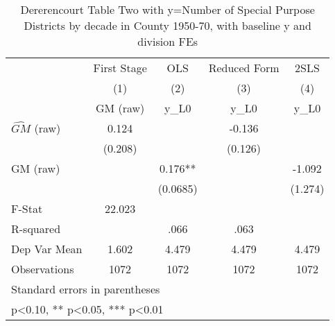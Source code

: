 \begin{table}[htbp]\centering
\def\sym#1{\ifmmode^{#1}\else\(^{#1}\)\fi}
\caption{Dererencourt Table Two with y=Number of Special Purpose Districts by decade in County 1950-70, with baseline y and division FEs}
\begin{tabular}{l*{4}{c}}
\toprule
                    & First Stage   &         OLS   &Reduced Form   &        2SLS   \\
                    &\multicolumn{1}{c}{(1)}&\multicolumn{1}{c}{(2)}&\multicolumn{1}{c}{(3)}&\multicolumn{1}{c}{(4)}\\
                    &\multicolumn{1}{c}{GM  (raw)}&\multicolumn{1}{c}{y\_L0}&\multicolumn{1}{c}{y\_L0}&\multicolumn{1}{c}{y\_L0}\\
\midrule
$\hat{GM}$ (raw)    &       0.124   &               &      -0.136   &               \\
                    &     (0.208)   &               &     (0.126)   &               \\
\addlinespace
GM  (raw)           &               &       0.176** &               &      -1.092   \\
                    &               &    (0.0685)   &               &     (1.274)   \\
\midrule
F-Stat              &      22.023   &               &               &               \\
R-squared           &               &        .066   &        .063   &               \\
Dep Var Mean        &       1.602   &       4.479   &       4.479   &       4.479   \\
Observations        &        1072   &        1072   &        1072   &        1072   \\
\bottomrule
\multicolumn{5}{l}{\footnotesize Standard errors in parentheses}\\
\multicolumn{5}{l}{\footnotesize * p<0.10, ** p<0.05, *** p<0.01}\\
\end{tabular}
\end{table}
